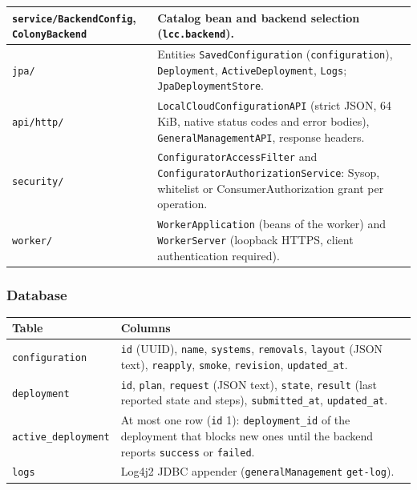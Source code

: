 \documentclass[a4paper]{arrowhead}
\begin{document}
\begin{longtable}{| >{\raggedright\arraybackslash}p{5.4cm} | >{\raggedright\arraybackslash}p{9.8cm} |}
\texttt{service/\allowbreak{}BackendConfig}, \texttt{ColonyBackend} & Catalog bean and backend selection (\texttt{lcc.\allowbreak{}backend}). \\ \hline
\texttt{jpa/} & Entities \texttt{SavedConfiguration} (\texttt{configuration}), \texttt{Deployment}, \texttt{ActiveDeployment}, \texttt{Logs}; \texttt{JpaDeploymentStore}. \\ \hline
\texttt{api/\allowbreak{}http/} & \texttt{LocalCloudConfigurationAPI} (strict JSON, 64 KiB, native status codes and error bodies), \texttt{GeneralManagementAPI}, response headers. \\ \hline
\texttt{security/} & \texttt{ConfiguratorAccessFilter} and \texttt{ConfiguratorAuthorizationService}: Sysop, whitelist or ConsumerAuthorization grant per operation. \\ \hline
\texttt{worker/} & \texttt{WorkerApplication} (beans of the worker) and \texttt{WorkerServer} (loopback HTTPS, client authentication required). \\ \hline
\end{longtable}

\subsubsection{Database}

\noindent\begin{longtable}{| >{\raggedright\arraybackslash}p{3.4cm} | >{\raggedright\arraybackslash}p{11.8cm} |} \hline
\rowcolor{gray!33} Table & Columns \\ \hline \endhead
\texttt{configuration} & \texttt{id} (UUID), \texttt{name}, \texttt{systems}, \texttt{removals}, \texttt{layout} (JSON text), \texttt{reapply}, \texttt{smoke}, \texttt{revision}, \texttt{updated\_\allowbreak{}at}. \\ \hline
\texttt{deployment} & \texttt{id}, \texttt{plan}, \texttt{request} (JSON text), \texttt{state}, \texttt{result} (last reported state and steps), \texttt{submitted\_\allowbreak{}at}, \texttt{updated\_\allowbreak{}at}. \\ \hline
\texttt{active\_\allowbreak{}deployment} & At most one row (\texttt{id} 1): \texttt{deployment\_\allowbreak{}id} of the deployment that blocks new ones until the backend reports \texttt{success} or \texttt{failed}. \\ \hline
\texttt{logs} & Log4j2 JDBC appender (\texttt{general\allowbreak{}Management} \texttt{get-\allowbreak{}log}). \\ \hline
\end{longtable}
\end{document}
